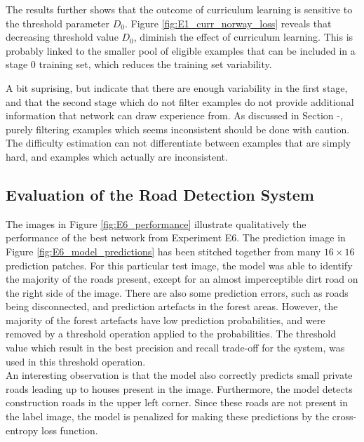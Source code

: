 The results further shows that the outcome of curriculum learning is sensitive to the threshold parameter $D_0$. Figure \ref{fig:E1_curr_norway_loss} reveals that decreasing threshold value $D_0$, diminish the effect of curriculum learning. This is probably linked to the smaller pool of eligible examples that can be included in a stage 0 training set, which reduces the training set variability.  

A bit suprising, but indicate that there are enough variability in the first stage, and that the second stage which do not filter examples do not provide additional information that network can draw experience from. As discussed in Section -, purely filtering examples which seems inconsistent should be done with caution. The difficulty estimation can not differentiate between examples that are simply hard, and examples which actually are inconsistent. 


\todo[inline]{}
\subsection{Evaluation of the Road Detection System}
The images in Figure \ref{fig:E6_performance} illustrate qualitatively the performance of the best network from Experiment E6. The prediction image in Figure \ref{fig:E6_model_predictions} has been stitched together from many $16 \times 16$ prediction patches. For this particular test image, the model was able to identify the majority of the roads present, except for an almost imperceptible dirt road on the right side of the image. There are also some prediction errors, such as roads being disconnected, and prediction artefacts in the forest areas. However, the majority of the forest artefacts have low prediction probabilities, and were removed by a threshold operation applied to the probabilities. The threshold value which result in the best precision and recall trade-off for the system, was used in this threshold operation.\\

An interesting observation is that the model also correctly predicts small private roads leading up to houses present in the image. Furthermore, the model detects construction roads in the upper left corner. Since these roads are not present in the label image, the model is penalized for making these predictions by the cross-entropy loss function.\\

